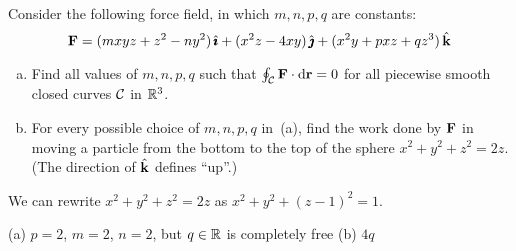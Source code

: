 \begin{question}[M317 2000D] %
Consider the following force field, in which $m,n,p,q$ are constants:
$$
\mathbf{F} 
= (mxyz + z^2 - ny^2)\,\hat{\pmb{\imath}} + (x^2 z - 4xy)\,\hat{\pmb{\jmath}} + (x^2y + pxz + qz^3)\,\hat{\mathbf{k}}
$$
\begin{enumerate}[(a)]
\item
Find all values of $m,n,p,q$ such that
$\oint_{\mathcal{C}} \mathbf{F}\cdot \mathrm{d}\mathbf{r} = 0$ for all piecewise smooth closed
curves $\mathcal{C}$ in $\mathbb{R}^3$.

\item
For every possible choice of $m,n,p,q$ in~(a), 
find the work done by $\mathbf{F}$ in moving a particle 
from the bottom to the top of the sphere $x^2 + y^2 + z^2 = 2z$.
(The direction of $\hat{\mathbf{k}}$ defines ``up''.)
\end{enumerate}
\end{question}

\begin{hint} 
We can rewrite $x^2 + y^2 + z^2 = 2z$ as $x^2+y^2+(z-1)^2=1$.
\end{hint}

\begin{answer}
(a) $p=2$, $m=2$, $n=2$, but $q\in\mathbb{R}$ is completely free\qquad
(b) $4q$
\end{answer}

